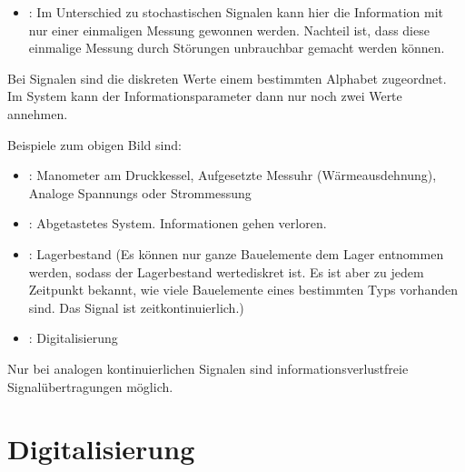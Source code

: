 \documentclass[letterpaper,10pt,english]{jupyterBook}
\begin{document}
\begin{itemize}
\item {} 
\sphinxAtStartPar
{}: Im Unterschied zu stochastischen Signalen kann hier die Information mit nur einer einmaligen Messung gewonnen werden. Nachteil ist, dass diese einmalige Messung durch Störungen unbrauchbar gemacht werden können.

\end{itemize}

\sphinxAtStartPar
Bei  Signalen sind die diskreten Werte einem bestimmten Alphabet zugeordnet. Im  System kann der Informationsparameter dann nur noch zwei Werte annehmen.

\sphinxAtStartPar
Beispiele zum obigen Bild sind:
\begin{itemize}
\item {} 
\sphinxAtStartPar
{}: Manometer am Druckkessel, Aufgesetzte Messuhr (Wärmeausdehnung), Analoge Spannungs\sphinxhyphen{} oder Strommessung

\item {} 
\sphinxAtStartPar
{}: Abgetastetes System. Informationen gehen verloren.

\item {} 
\sphinxAtStartPar
{}: Lagerbestand (Es können nur ganze Bauelemente dem Lager entnommen werden, sodass der Lagerbestand wertediskret ist. Es ist aber zu jedem Zeitpunkt bekannt, wie viele Bauelemente eines bestimmten Typs vorhanden sind. Das Signal ist zeitkontinuierlich.)

\item {} 
\sphinxAtStartPar
{}: Digitalisierung

\end{itemize}

\sphinxAtStartPar
Nur bei analogen kontinuierlichen Signalen sind informationsverlustfreie Signalübertragungen möglich.

\sphinxstepscope


\section{Digitalisierung}
\label{\detokenize{content/2_Digital:digitalisierung}}\label{\detokenize{content/2_Digital::doc}}
\end{document}
